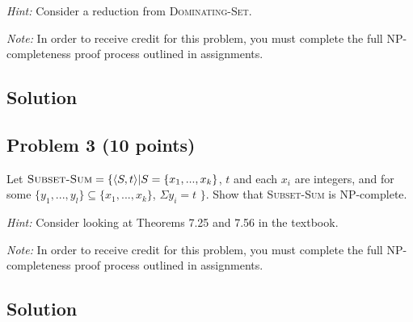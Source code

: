 \documentclass{article}
\begin{document}
\begin{empfile}
\emph{Hint:} Consider a reduction from \textsc{Dominating-Set}.

\emph{Note:} In order to receive credit for this problem, you must complete the full NP-completeness proof process outlined in assignments.

\subsection*{Solution}


\subsection*{Problem 3 (10 points)}

Let $\textsc{Subset-Sum} = \{ \langle S,t \rangle | S = \{ x_1,...,x_k\}$, $t$ and each $x_i$ are integers,
and for some $\{y_1,...,y_l\} \subseteq \{ x_1,...,x_k\}$, $\Sigma y_i = t$  $\}$.
Show that \textsc{Subset-Sum} is NP-complete.

\emph{Hint:} Consider looking at Theorems 7.25 and 7.56 in the textbook.

\emph{Note:} In order to receive credit for this problem, you must complete the full NP-completeness proof process outlined in assignments.


\subsection*{Solution}





\end{empfile}
\immediate{}
\end{document}
